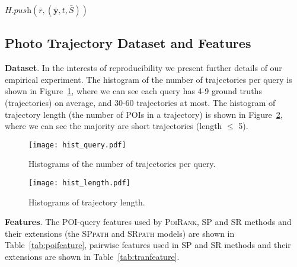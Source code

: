 \begin{algorithm}[htbp]
\begin{algorithmic}[1]
        $H.\textit{push}\left(\bar{r}, (\bar{\mathbf{y}}, t, \bar{S}) \right)$
    \ENDFOR
\ENDWHILE
\end{algorithmic}
\end{algorithm}

\clearpage
\subsection{Photo Trajectory Dataset and Features}
\label{sec:feature}

\textbf{Dataset}.
In the interests of reproducibility we present further details of our empirical experiment.
The histogram of the number of trajectories per query is shown in Figure~\ref{fig:hist_query},
where we can see each query has 4-9 ground truths (\ie trajectories) on average, and 30-60 trajectories at most.
The histogram of trajectory length (\ie the number of POIs in a trajectory) is shown in Figure~\ref{fig:hist_length},
where we can see the majority are short trajectories (\ie length $\le$ 5).

\begin{figure}[t]
	\centering
	\texttt{[image: hist\_query.pdf]}
	\caption{Histograms of the number of trajectories per query.}
	\label{fig:hist_query}
\end{figure}


\begin{figure}[t]
	\centering
	\texttt{[image: hist\_length.pdf]}
	\caption{Histograms of trajectory length.}
	\label{fig:hist_length}
\end{figure}


\textbf{Features}.
The POI-query features used by \textsc{PoiRank}, SP and SR methods and their extensions 
(\ie the \textsc{SPpath} and \textsc{SRpath} models) are shown in Table~\ref{tab:poifeature},
pairwise features used in SP and SR methods and their extensions are shown in Table~\ref{tab:tranfeature}.

